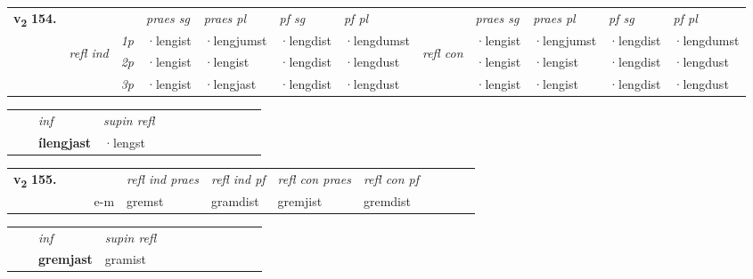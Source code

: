 \begin{tabular}{llllllllllll} \toprule
\multirow{4}{*}{{{\textbf{v{\textsubscript{2}}} \Large{\textbf{154.}}}}}  & &   &  \textit{praes sg}  & \textit{praes pl}  &\textit{pf sg} & \textit{pf pl} &  &  \textit{praes sg}  & \textit{praes pl}  & \textit{pf sg} & \textit{pf pl } \\*
	\cmidrule{4-7} \cmidrule{9-12}
 &\multirow{3}{*}{\begin{turn}{90}\textit{refl ind}\end{turn}} & {\textit{1p}} & ·lengist & ·lengjumst    & ·lengdist & ·lengdumst & \multirow{3}{*}{\begin{turn}{90}\textit{refl con}\end{turn}}  &·lengist & ·lengjumst & ·lengdist & ·lengdumst\\*
 &&  {\textit{2p}} &  ·lengist  & ·lengist   & ·lengdist & ·lengdust & &·lengist & ·lengist & ·lengdist & ·lengdust \\*
& &  {\textit{3p}} & ·lengist & ·lengjast   & ·lengdist & ·lengdust & & ·lengist & ·lengist& ·lengdist & ·lengdust  \\*
\cmidrule{4-7} \cmidrule{9-12}
\end{tabular}


\begin{tabular}{llllllllllll}
 & & \textit{inf}       & \textit{supin refl}      \\*
  & & \textbf{ílengjast}        & ·lengst  \\*
\cmidrule{1-12}
\end{tabular}





\begin{tabular}{llllllllllll}\toprule
\multirow{4}{*}{{{\textbf{v{\textsubscript{2}}} \Large{\textbf{155.}}}}}  & &  & &  \textit{refl ind praes} & \textit{refl ind pf} & \textit{refl con praes} & \textit{refl con pf} \\*
&  & & e-m & gremst & gramdist & gremjist & gremdist \\*
\cmidrule{5-9}
\end{tabular}


\begin{tabular}{llllllllllll}
 & & \textit{inf}       & \textit{supin refl}      \\*
  & & \textbf{gremjast}        & gramist  \\*
\cmidrule{1-12}
\end{tabular}



